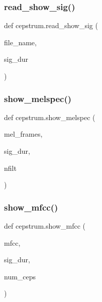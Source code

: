 \mbox{\label{namespacecepstrum_af44fa6a9e5f5e8db043cb60b38894085}} 
\subsubsection{\texorpdfstring{read\+\_\+show\+\_\+sig()}{read\_show\_sig()}}
{\footnotesize\ttfamily def cepstrum.\+read\+\_\+show\+\_\+sig (\begin{DoxyParamCaption}\item[{}]{file\+\_\+name,  }\item[{}]{sig\+\_\+dur }\end{DoxyParamCaption})}

\mbox{\label{namespacecepstrum_a3e21b1c622287001e82e62c0c64d0643}} 
\subsubsection{\texorpdfstring{show\+\_\+melspec()}{show\_melspec()}}
{\footnotesize\ttfamily def cepstrum.\+show\+\_\+melspec (\begin{DoxyParamCaption}\item[{}]{mel\+\_\+frames,  }\item[{}]{sig\+\_\+dur,  }\item[{}]{nfilt }\end{DoxyParamCaption})}

\mbox{\label{namespacecepstrum_a43917229e1efedf7a3439fdfc6b2890a}} 
\subsubsection{\texorpdfstring{show\+\_\+mfcc()}{show\_mfcc()}}
{\footnotesize\ttfamily def cepstrum.\+show\+\_\+mfcc (\begin{DoxyParamCaption}\item[{}]{mfcc,  }\item[{}]{sig\+\_\+dur,  }\item[{}]{num\+\_\+ceps }\end{DoxyParamCaption})}

